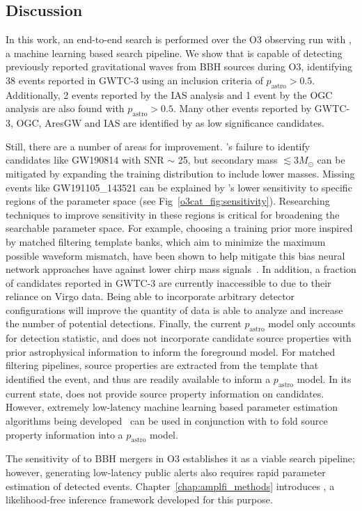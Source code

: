 \begin{refsection}
\newpage


\section{Discussion}\label{o3cat_sec:conclusion}
In this work, an end-to-end search is performed over the O3 observing run with \aframe, a machine learning based search pipeline. 
We show that \aframe is capable of detecting previously reported gravitational waves from BBH sources during O3, identifying 38 events reported in GWTC-3 using an inclusion criteria of $p_{\mathrm{astro}} > 0.5$. 
Additionally, 2 events reported by the IAS analysis and 1 event by the OGC analysis are also found with $p_{\mathrm{astro}} > 0.5$. 
Many other events reported by GWTC-3, OGC, AresGW and IAS are identified by \aframe as low significance candidates. 

Still, there are a number of areas for improvement. 
\aframe's failure to identify candidates like GW190814 with SNR $\sim$ 25, but secondary mass $\lesssim 3 M_\odot$ can be mitigated by expanding the training distribution to include lower masses. 
Missing events like GW191105\_143521 can be explained by \aframe's lower sensitivity to specific regions of the parameter space (see Fig~\ref{o3cat_fig:sensitivity}). 
Researching techniques to improve sensitivity in these regions is critical for broadening the searchable parameter space. 
For example, choosing a training prior more inspired by matched filtering template banks, which aim to minimize the maximum possible waveform mismatch, have been shown to help mitigate this bias neural network approaches have against lower chirp mass signals~\cite{sage}. 
In addition, a fraction of candidates reported in GWTC-3 are currently inaccessible to \aframe due to their reliance on Virgo data. 
Being able to incorporate arbitrary detector configurations will improve the quantity of data \aframe is able to analyze and increase the number of potential detections. 
Finally, the current $p_{\mathrm{astro}}$ model only accounts for detection statistic, and does not incorporate candidate source properties with prior astrophysical information to inform the foreground model. 
For matched filtering pipelines, source properties are extracted from the template that identified the event, and thus are readily available to inform a $p_{\mathrm{astro}}$ model. 
In its current state, \aframe does not provide source property information on candidates. 
However, extremely low-latency machine learning based parameter estimation algorithms being developed~\cite{Chatterjee:2024pbj, Dax_2021} can be used in conjunction with \aframe to fold source property information into a $p_{\mathrm{astro}}$ model.

The sensitivity of \aframe to BBH mergers in O3 establishes it as a viable search pipeline; however, generating low-latency public alerts also requires rapid parameter estimation of detected events.
Chapter~\ref{chap:amplfi_methods} introduces \amplfi, a likelihood-free inference framework developed for this purpose.





\singlespacing
\printbibliography[title=References,heading=subbibintoc]
\end{refsection}